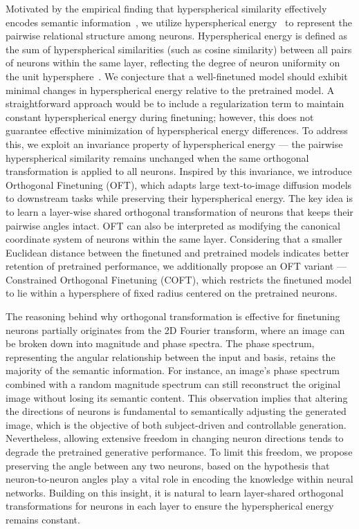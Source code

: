 Motivated by the empirical finding that hyperspherical similarity effectively encodes semantic information~\cite{liu2017deep,liu2018decoupled,chen2020angular}, we utilize hyperspherical energy~\cite{liu2018learning} to represent the pairwise relational structure among neurons. Hyperspherical energy is defined as the sum of hyperspherical similarities (such as cosine similarity) between all pairs of neurons within the same layer, reflecting the degree of neuron uniformity on the unit hypersphere~\cite{liu2021learning}. We conjecture that a well-finetuned model should exhibit minimal changes in hyperspherical energy relative to the pretrained model. A straightforward approach would be to include a regularization term to maintain constant hyperspherical energy during finetuning; however, this does not guarantee effective minimization of hyperspherical energy differences. To address this, we exploit an invariance property of hyperspherical energy — the pairwise hyperspherical similarity remains unchanged when the same orthogonal transformation is applied to all neurons. Inspired by this invariance, we introduce Orthogonal Finetuning (OFT), which adapts large text-to-image diffusion models to downstream tasks while preserving their hyperspherical energy. The key idea is to learn a layer-wise shared orthogonal transformation of neurons that keeps their pairwise angles intact. OFT can also be interpreted as modifying the canonical coordinate system of neurons within the same layer. Considering that a smaller Euclidean distance between the finetuned and pretrained models indicates better retention of pretrained performance, we additionally propose an OFT variant — Constrained Orthogonal Finetuning (COFT), which restricts the finetuned model to lie within a hypersphere of fixed radius centered on the pretrained neurons.

The reasoning behind why orthogonal transformation is effective for finetuning neurons partially originates from the 2D Fourier transform, where an image can be broken down into magnitude and phase spectra. The phase spectrum, representing the angular relationship between the input and basis, retains the majority of the semantic information. For instance, an image’s phase spectrum combined with a random magnitude spectrum can still reconstruct the original image without losing its semantic content. This observation implies that altering the directions of neurons is fundamental to semantically adjusting the generated image, which is the objective of both subject-driven and controllable generation. Nevertheless, allowing extensive freedom in changing neuron directions tends to degrade the pretrained generative performance. To limit this freedom, we propose preserving the angle between any two neurons, based on the hypothesis that neuron-to-neuron angles play a vital role in encoding the knowledge within neural networks. Building on this insight, it is natural to learn layer-shared orthogonal transformations for neurons in each layer to ensure the hyperspherical energy remains constant.

